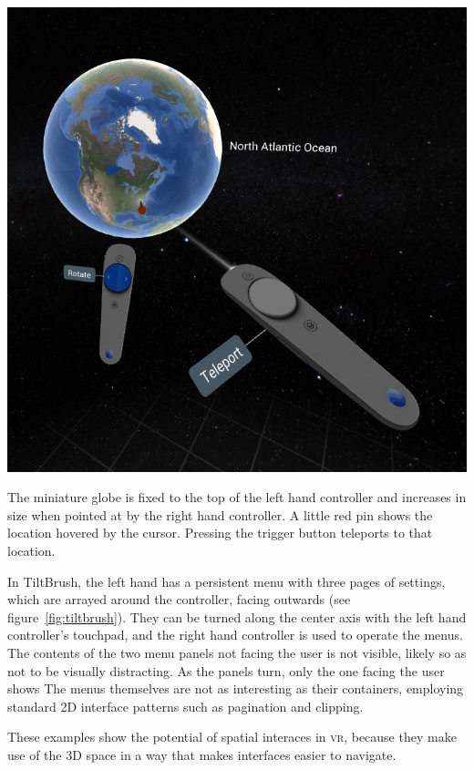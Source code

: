 \documentclass{tufte-book} %
\begin{document}
\begin{marginfigure}
  \includegraphics[width=\linewidth]{globe.png}
  \caption{The miniature globe is fixed to the top of the left hand controller and increases in size when pointed at by the right hand controller. A little red pin shows the location hovered by the cursor. Pressing the trigger button teleports to that location.}
  \label{fig:globe}
\end{marginfigure}

In TiltBrush, the left hand has a persistent menu with three pages of settings, which are arrayed around the controller, facing outwards (see figure~\ref{fig:tiltbrush}). They can be turned along the center axis with the left hand controller's touchpad, and the right hand controller is used to operate the menus.
The contents of the two menu panels not facing the user is not visible, likely so as not to be visually distracting. As the panels turn, only the one facing the user shows
The menus themselves are not as interesting as their containers, employing standard 2D interface patterns such as pagination and clipping.

These examples show the potential of spatial interaces in \textsc{vr}, because they make use of the 3D space in a way that makes interfaces easier to navigate.
\end{document}
